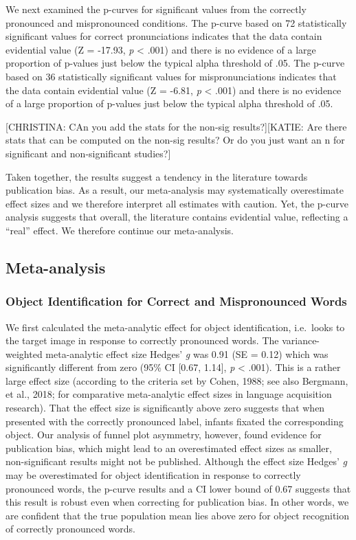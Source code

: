 \documentclass[man]{apa6}
\theoremstyle{definition}
\theoremstyle{definition}
\theoremstyle{definition}
\theoremstyle{remark}
\begin{document}
We next examined the p-curves for significant values from the correctly
pronounced and mispronounced conditions. The p-curve based on 72
statistically significant values for correct pronunciations indicates
that the data contain evidential value (Z = -17.93, \emph{p} \textless{}
.001) and there is no evidence of a large proportion of p-values just
below the typical alpha threshold of .05. The p-curve based on 36
statistically significant values for mispronunciations indicates that
the data contain evidential value (Z = -6.81, \emph{p} \textless{} .001)
and there is no evidence of a large proportion of p-values just below
the typical alpha threshold of .05.

{[}CHRISTINA: CAn you add the stats for the non-sig results?{]}{[}KATIE:
Are there stats that can be computed on the non-sig results? Or do you
just want an n for significant and non-significant studies?{]}

Taken together, the results suggest a tendency in the literature towards
publication bias. As a result, our meta-analysis may systematically
overestimate effect sizes and we therefore interpret all estimates with
caution. Yet, the p-curve analysis suggests that overall, the literature
contains evidential value, reflecting a \enquote{real} effect. We
therefore continue our meta-analysis.

\subsection{Meta-analysis}\label{meta-analysis-1}

\subsubsection{Object Identification for Correct and Mispronounced
Words}\label{object-identification-for-correct-and-mispronounced-words}

We first calculated the meta-analytic effect for object identification,
i.e.~looks to the target image in response to correctly pronounced
words. The variance-weighted meta-analytic effect size Hedges' \emph{g}
was 0.91 (SE = 0.12) which was significantly different from zero (95\%
CI {[}0.67, 1.14{]}, \emph{p} \textless{} .001). This is a rather large
effect size (according to the criteria set by Cohen, 1988; see also
Bergmann, et al., 2018; for comparative meta-analytic effect sizes in
language acquisition research). That the effect size is significantly
above zero suggests that when presented with the correctly pronounced
label, infants fixated the corresponding object. Our analysis of funnel
plot asymmetry, however, found evidence for publication bias, which
might lead to an overestimated effect sizes as smaller, non-significant
results might not be published. Although the effect size Hedges'
\emph{g} may be overestimated for object identification in response to
correctly pronounced words, the p-curve results and a CI lower bound of
0.67 suggests that this result is robust even when correcting for
publication bias. In other words, we are confident that the true
population mean lies above zero for object recognition of correctly
pronounced words.
\end{document}

